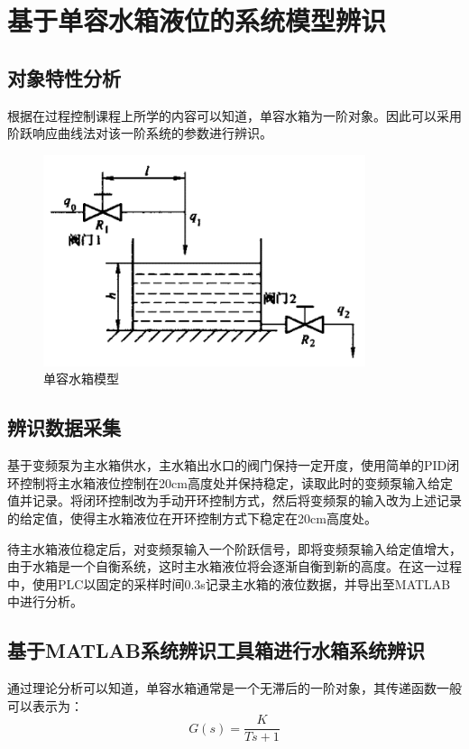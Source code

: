 \documentclass[UTF8]{article}
\begin{document}
%
\section{基于单容水箱液位的系统模型辨识}
\subsection{对象特性分析}
根据在过程控制课程上所学的内容可以知道，单容水箱为一阶对象。因此可以采用阶跃响应曲线法对该一阶系统的参数进行辨识。
\begin{figure}[H]
    \centering %
    \includegraphics[width=.6\textwidth]{figure/单容水箱模型.png} 
    \caption{单容水箱模型} %
\end{figure}

\subsection{辨识数据采集}
基于变频泵为主水箱供水，主水箱出水口的阀门保持一定开度，使用简单的PID闭环控制将主水箱液位控制在20cm高度处并保持稳定，读取此时的变频泵输入给定值并记录。将闭环控制改为手动开环控制方式，然后将变频泵的输入改为上述记录的给定值，使得主水箱液位在开环控制方式下稳定在20cm高度处。

待主水箱液位稳定后，对变频泵输入一个阶跃信号，即将变频泵输入给定值增大，由于水箱是一个自衡系统，这时主水箱液位将会逐渐自衡到新的高度。在这一过程中，使用PLC以固定的采样时间0.3s记录主水箱的液位数据，并导出至MATLAB中进行分析。

\subsection{基于MATLAB系统辨识工具箱进行水箱系统辨识}
通过理论分析可以知道，单容水箱通常是一个无滞后的一阶对象，其传递函数一般可以表示为：
\begin{equation*}
	G(s) = \frac{K}{Ts + 1}
\end{equation*}
\end{document}
